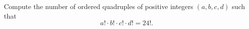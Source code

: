 Compute the number of ordered quadruples of positive integers $(a,b,c,d)$ such that 
\[ a!\cdot b!\cdot c!\cdot d!=24!. \]
